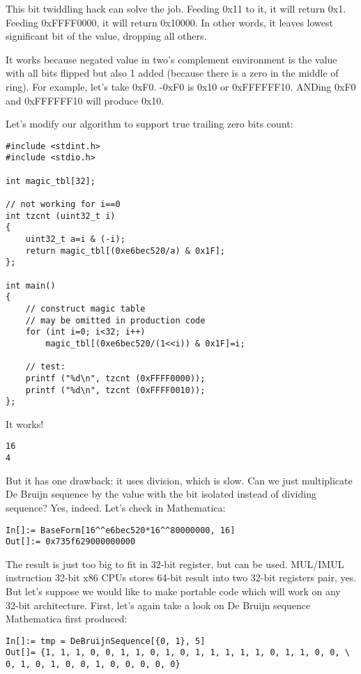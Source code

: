 This bit twiddling hack can solve the job. Feeding 0x11 to it, it will return 0x1. Feeding 0xFFFF0000, it will return 0x10000.
In other words, it leaves lowest significant bit of the value, dropping all others.

It works because negated value in two's complement environment is the value with all bits flipped but also 1 added (because there is a zero in the middle of ring).
For example, let's take 0xF0. -0xF0 is 0x10 or 0xFFFFFF10. ANDing 0xF0 and 0xFFFFFF10 will produce 0x10.

Let's modify our algorithm to support true trailing zero bits count:

\begin{lstlisting}[style=customc]
#include <stdint.h>
#include <stdio.h>

int magic_tbl[32];

// not working for i==0
int tzcnt (uint32_t i)
{
	uint32_t a=i & (-i);
	return magic_tbl[(0xe6bec520/a) & 0x1F];
};

int main()
{
	// construct magic table
	// may be omitted in production code
	for (int i=0; i<32; i++)
		magic_tbl[(0xe6bec520/(1<<i)) & 0x1F]=i;

	// test:
	printf ("%d\n", tzcnt (0xFFFF0000));
	printf ("%d\n", tzcnt (0xFFFF0010));
};
\end{lstlisting}

It works!

\begin{lstlisting}
16
4
\end{lstlisting}

But it has one drawback: it uses division, which is slow.
Can we just multiplicate De Bruijn sequence by the value with the bit isolated instead of dividing sequence?
Yes, indeed.
Let's check in Mathematica:

\begin{lstlisting}
In[]:= BaseForm[16^^e6bec520*16^^80000000, 16]
Out[]:= 0x735f629000000000
\end{lstlisting}

The result is just too big to fit in 32-bit register, but can be used.
MUL/IMUL instruction 32-bit x86 CPUs stores 64-bit result into two 32-bit registers pair, yes.
But let's suppose we would like to make portable code which will work on any 32-bit architecture.
First, let's again take a look on De Bruijn sequence Mathematica first produced:

\begin{lstlisting}
In[]:= tmp = DeBruijnSequence[{0, 1}, 5]
Out[]= {1, 1, 1, 0, 0, 1, 1, 0, 1, 0, 1, 1, 1, 1, 1, 0, 1, 1, 0, 0, \
0, 1, 0, 1, 0, 0, 1, 0, 0, 0, 0, 0}
\end{lstlisting}

